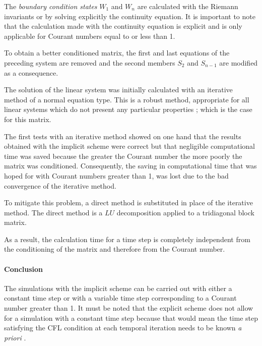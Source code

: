 The \textit{boundary condition states} $W_1$ and $W_n$ are calculated with the Riemann invariants or by solving explicitly the continuity equation. It is important to note that the calculation made with the continuity equation is explicit and is only applicable for Courant numbers equal to or less than 1.

\vspace{0.5cm}

To obtain a better conditioned matrix, the first and last equations of the preceding system are removed and the second members $S_2$ and $S_{n-1}$ are modified as a consequence.

\vspace{0.5cm}

The solution of the linear system was initially calculated with an iterative method of a normal equation type. This is a robust method, appropriate for all linear systems which do not present any particular properties ; which is the case for this matrix.

\vspace{0.5cm}

The first tests with an iterative method showed on one hand that the results obtained with the implicit scheme were correct but that negligible computational time was saved because the greater the Courant number the more poorly the matrix was conditioned. Consequently, the saving in computational time that was hoped for with Courant numbers greater than 1, was lost due to the bad convergence of the iterative method.

\vspace{0.5cm}

To mitigate this problem, a direct method is substituted in place of the iterative method. The direct method is a $LU$ decomposition applied to a tridiagonal block matrix.

\vspace{0.5cm}

As a result, the calculation time for a time step is completely independent from the conditioning of the matrix and therefore from the Courant number.

\paragraph{Conclusion\\}

\hspace*{1cm}

The simulations with the implicit scheme can be carried out with either a constant time step or with a variable time step corresponding to a Courant number greater than 1. It must be noted that the explicit scheme does not allow for a simulation with a constant time step because that would mean the time step satisfying the CFL condition at each temporal iteration needs to be known \textit{a priori} .


